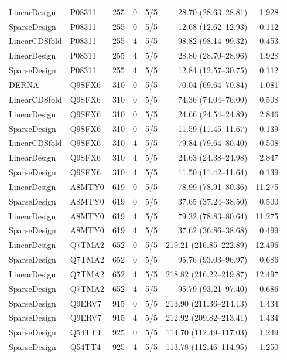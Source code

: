 \begin{longtable}{llrrrrr}
LinearDesign & P08311 & 255 & 0 & 5/5 & 28.70 (28.63--28.81) & 1.928 \\
SparseDesign & P08311 & 255 & 0 & 5/5 & 12.68 (12.62--12.93) & 0.112 \\
LinearCDSfold & P08311 & 255 & 4 & 5/5 & 98.82 (98.14--99.32) & 0.453 \\
LinearDesign & P08311 & 255 & 4 & 5/5 & 28.80 (28.70--28.96) & 1.928 \\
SparseDesign & P08311 & 255 & 4 & 5/5 & 12.84 (12.57--30.75) & 0.112 \\
DERNA & Q9SFX6 & 310 & 0 & 5/5 & 70.04 (69.64--70.84) & 1.081 \\
LinearCDSfold & Q9SFX6 & 310 & 0 & 5/5 & 74.36 (74.04--76.00) & 0.508 \\
LinearDesign & Q9SFX6 & 310 & 0 & 5/5 & 24.66 (24.54--24.89) & 2.846 \\
SparseDesign & Q9SFX6 & 310 & 0 & 5/5 & 11.59 (11.45--11.67) & 0.139 \\
LinearCDSfold & Q9SFX6 & 310 & 4 & 5/5 & 79.84 (79.64--80.40) & 0.508 \\
LinearDesign & Q9SFX6 & 310 & 4 & 5/5 & 24.63 (24.38--24.98) & 2.847 \\
SparseDesign & Q9SFX6 & 310 & 4 & 5/5 & 11.50 (11.42--11.64) & 0.139 \\
LinearDesign & A8MTY0 & 619 & 0 & 5/5 & 78.99 (78.91--80.36) & 11.275 \\
SparseDesign & A8MTY0 & 619 & 0 & 5/5 & 37.65 (37.24--38.50) & 0.500 \\
LinearDesign & A8MTY0 & 619 & 4 & 5/5 & 79.32 (78.83--80.64) & 11.275 \\
SparseDesign & A8MTY0 & 619 & 4 & 5/5 & 37.62 (36.86--38.68) & 0.499 \\
LinearDesign & Q7TMA2 & 652 & 0 & 5/5 & 219.21 (216.85--222.89) & 12.496 \\
SparseDesign & Q7TMA2 & 652 & 0 & 5/5 & 95.76 (93.03--96.97) & 0.686 \\
LinearDesign & Q7TMA2 & 652 & 4 & 5/5 & 218.82 (216.22--219.87) & 12.497 \\
SparseDesign & Q7TMA2 & 652 & 4 & 5/5 & 95.79 (93.21--97.40) & 0.686 \\
SparseDesign & Q9ERV7 & 915 & 0 & 5/5 & 213.90 (211.36--214.13) & 1.434 \\
SparseDesign & Q9ERV7 & 915 & 4 & 5/5 & 212.92 (209.82--213.41) & 1.434 \\
SparseDesign & Q54TT4 & 925 & 0 & 5/5 & 114.70 (112.49--117.03) & 1.249 \\
SparseDesign & Q54TT4 & 925 & 4 & 5/5 & 113.78 (112.46--114.95) & 1.250 \\
\bottomrule
\end{longtable}
